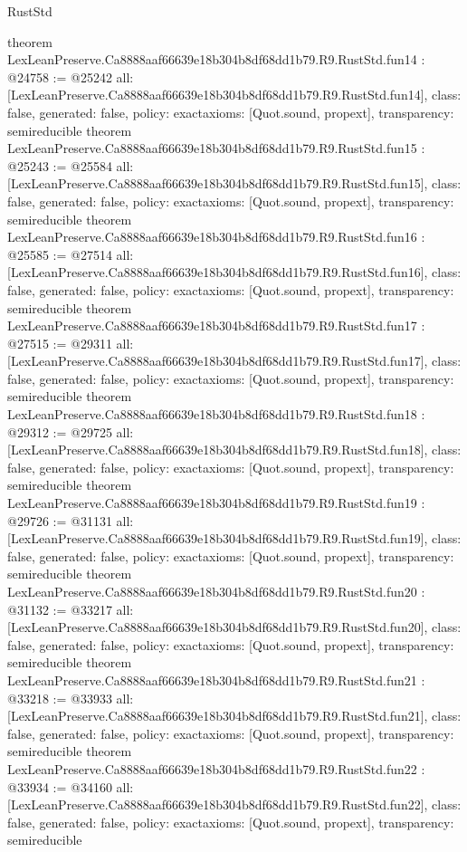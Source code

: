 \begin{lexlean}{RustStd}
\begin{coremodule}
{}
theorem LexLeanPreserve.Ca8888aaf66639e18b304b8df68dd1b79.R9.RustStd.fun14 : @24758 := @25242 {
  all: [LexLeanPreserve.Ca8888aaf66639e18b304b8df68dd1b79.R9.RustStd.fun14],
  class: false,
  generated: false,
  policy: exact{axioms: [Quot.sound, propext]},
  transparency: semireducible
}
theorem LexLeanPreserve.Ca8888aaf66639e18b304b8df68dd1b79.R9.RustStd.fun15 : @25243 := @25584 {
  all: [LexLeanPreserve.Ca8888aaf66639e18b304b8df68dd1b79.R9.RustStd.fun15],
  class: false,
  generated: false,
  policy: exact{axioms: [Quot.sound, propext]},
  transparency: semireducible
}
theorem LexLeanPreserve.Ca8888aaf66639e18b304b8df68dd1b79.R9.RustStd.fun16 : @25585 := @27514 {
  all: [LexLeanPreserve.Ca8888aaf66639e18b304b8df68dd1b79.R9.RustStd.fun16],
  class: false,
  generated: false,
  policy: exact{axioms: [Quot.sound, propext]},
  transparency: semireducible
}
theorem LexLeanPreserve.Ca8888aaf66639e18b304b8df68dd1b79.R9.RustStd.fun17 : @27515 := @29311 {
  all: [LexLeanPreserve.Ca8888aaf66639e18b304b8df68dd1b79.R9.RustStd.fun17],
  class: false,
  generated: false,
  policy: exact{axioms: [Quot.sound, propext]},
  transparency: semireducible
}
theorem LexLeanPreserve.Ca8888aaf66639e18b304b8df68dd1b79.R9.RustStd.fun18 : @29312 := @29725 {
  all: [LexLeanPreserve.Ca8888aaf66639e18b304b8df68dd1b79.R9.RustStd.fun18],
  class: false,
  generated: false,
  policy: exact{axioms: [Quot.sound, propext]},
  transparency: semireducible
}
theorem LexLeanPreserve.Ca8888aaf66639e18b304b8df68dd1b79.R9.RustStd.fun19 : @29726 := @31131 {
  all: [LexLeanPreserve.Ca8888aaf66639e18b304b8df68dd1b79.R9.RustStd.fun19],
  class: false,
  generated: false,
  policy: exact{axioms: [Quot.sound, propext]},
  transparency: semireducible
}
theorem LexLeanPreserve.Ca8888aaf66639e18b304b8df68dd1b79.R9.RustStd.fun20 : @31132 := @33217 {
  all: [LexLeanPreserve.Ca8888aaf66639e18b304b8df68dd1b79.R9.RustStd.fun20],
  class: false,
  generated: false,
  policy: exact{axioms: [Quot.sound, propext]},
  transparency: semireducible
}
theorem LexLeanPreserve.Ca8888aaf66639e18b304b8df68dd1b79.R9.RustStd.fun21 : @33218 := @33933 {
  all: [LexLeanPreserve.Ca8888aaf66639e18b304b8df68dd1b79.R9.RustStd.fun21],
  class: false,
  generated: false,
  policy: exact{axioms: [Quot.sound, propext]},
  transparency: semireducible
}
theorem LexLeanPreserve.Ca8888aaf66639e18b304b8df68dd1b79.R9.RustStd.fun22 : @33934 := @34160 {
  all: [LexLeanPreserve.Ca8888aaf66639e18b304b8df68dd1b79.R9.RustStd.fun22],
  class: false,
  generated: false,
  policy: exact{axioms: [Quot.sound, propext]},
  transparency: semireducible
}
\end{coremodule}
\end{lexlean}
